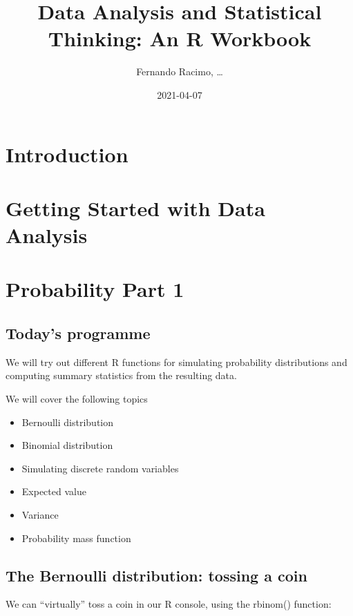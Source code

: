 \documentclass[
]{book}
\title{Data Analysis and Statistical Thinking: An R Workbook}
\author{Fernando Racimo, \ldots{}}
\date{2021-04-07}
\providecommand{\tightlist}{%
  \setlength{\itemsep}{0pt}\setlength{\parskip}{0pt}}
\begin{document}
\maketitle

{
\setcounter{tocdepth}{1}
\tableofcontents
}
\hypertarget{introduction}{%
\chapter{Introduction}\label{introduction}}

\hypertarget{intro}{%
\chapter{Getting Started with Data Analysis}\label{intro}}

\hypertarget{prob1}{%
\chapter{Probability Part 1}\label{prob1}}

\hypertarget{todays-programme}{%
\section{Today's programme}\label{todays-programme}}

We will try out different R functions for simulating probability distributions and computing summary statistics from the resulting data.

We will cover the following topics

\begin{itemize}
\tightlist
\item
  Bernoulli distribution
\item
  Binomial distribution
\item
  Simulating discrete random variables
\item
  Expected value
\item
  Variance
\item
  Probability mass function
\end{itemize}

\hypertarget{the-bernoulli-distribution-tossing-a-coin}{%
\section{The Bernoulli distribution: tossing a coin}\label{the-bernoulli-distribution-tossing-a-coin}}

We can ``virtually'' toss a coin in our R console, using the rbinom() function:
\end{document}

